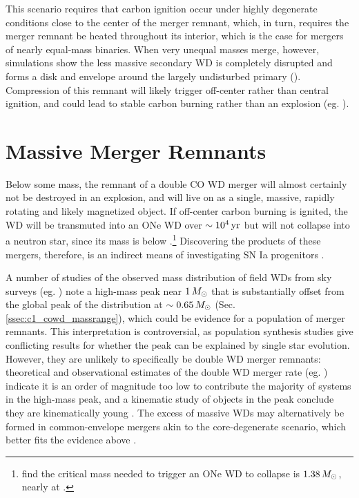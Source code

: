 This scenario requires that carbon ignition occur under highly degenerate conditions close to the center of the merger remnant, which, in turn, requires the merger remnant be heated throughout its interior, which is the case for mergers of nearly equal-mass binaries.  When very unequal masses merge, however, simulations show the less massive secondary WD is completely disrupted and forms a disk and envelope around the largely undisturbed primary (\citeal{loreig09}).  Compression of this remnant will likely trigger off-center rather than central ignition, and could lead to stable carbon burning rather than an explosion (eg. \citealt{yoonpr07, shen+12}).

\section{Massive Merger Remnants}
\label{sec:c1_hotdqs}

Below some mass, the remnant of a double CO WD merger will almost certainly not be destroyed in an explosion, and will live on as a single, massive, rapidly rotating and likely magnetized object.  If off-center carbon burning is ignited, the WD will be transmuted into an ONe WD over $\sim10^4\,\mathrm{yr}$ \citep{nomoi85, shen+12, schw+16} but will not collapse into a neutron star, since its mass is below \Mch.\footnote{\cite{schwqb15} find the critical mass needed to trigger an ONe WD to collapse is $1.38\,\Msun$, nearly at \Mch.}  Discovering the products of these mergers, therefore, is an indirect means of investigating SN Ia progenitors \citep{dunlc15}.

A number of studies of the observed mass distribution of field WDs from sky surveys (eg. \citealt{liebbh05, giambd12, klei+13, reba+15a, reba+15b}) note a high-mass peak near $1\,\Msun$ that is substantially offset from the global peak of the distribution at $\sim0.65\,\Msun$ (Sec. \ref{ssec:c1_cowd_massrange}), which could be evidence for a population of merger remnants.  This interpretation is controversial, as population synthesis studies \citep{reba+15a, trem+16} give conflicting results for whether the peak can be explained by single star evolution.  However, they are unlikely to specifically be double WD merger remnants: theoretical and observational estimates of the double WD merger rate (eg. \citealt{badem12, toonnp12}) indicate it is an order of magnitude too low \citep{trem+16} to contribute the majority of systems in the high-mass peak, and a kinematic study of objects in the peak conclude they are kinematically young \citep{weggp12}.  The excess of massive WDs may alternatively be formed in common-envelope mergers akin to the core-degenerate scenario, which better fits the evidence above \citep{reba+15b, brig+15}.

